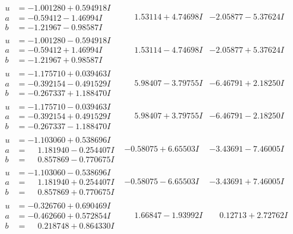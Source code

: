 \documentclass[1p]{elsarticle_modified}
\theoremstyle{definition}
\begin{document}
$$\begin{array}{c|c|c}
\begin{aligned}
u &= -1.001280 + 0.594918 I \\
a &= -0.59412 - 1.46994 I \\
b &= -1.21967 - 0.98587 I\end{aligned}
 & \phantom{-}1.53114 + 4.74698 I & -2.05877 - 5.37624 I \\ \hline\begin{aligned}
u &= -1.001280 - 0.594918 I \\
a &= -0.59412 + 1.46994 I \\
b &= -1.21967 + 0.98587 I\end{aligned}
 & \phantom{-}1.53114 - 4.74698 I & -2.05877 + 5.37624 I \\ \hline\begin{aligned}
u &= -1.175710 + 0.039463 I \\
a &= -0.392154 - 0.491529 I \\
b &= -0.267337 + 1.188470 I\end{aligned}
 & \phantom{-}5.98407 - 3.79755 I & -6.46791 + 2.18250 I \\ \hline\begin{aligned}
u &= -1.175710 - 0.039463 I \\
a &= -0.392154 + 0.491529 I \\
b &= -0.267337 - 1.188470 I\end{aligned}
 & \phantom{-}5.98407 + 3.79755 I & -6.46791 - 2.18250 I \\ \hline\begin{aligned}
u &= -1.103060 + 0.538696 I \\
a &= \phantom{-}1.181940 - 0.254407 I \\
b &= \phantom{-}0.857869 - 0.770675 I\end{aligned}
 & -0.58075 + 6.65503 I & -3.43691 - 7.46005 I \\ \hline\begin{aligned}
u &= -1.103060 - 0.538696 I \\
a &= \phantom{-}1.181940 + 0.254407 I \\
b &= \phantom{-}0.857869 + 0.770675 I\end{aligned}
 & -0.58075 - 6.65503 I & -3.43691 + 7.46005 I \\ \hline\begin{aligned}
u &= -0.326760 + 0.690469 I \\
a &= -0.462660 + 0.572854 I \\
b &= \phantom{-}0.218748 + 0.864330 I\end{aligned}
 & \phantom{-}1.66847 - 1.93992 I & \phantom{-}0.12713 + 2.72762 I \\ \hline\begin{aligned}

\end{aligned}
\end{array}$$
\end{document}
